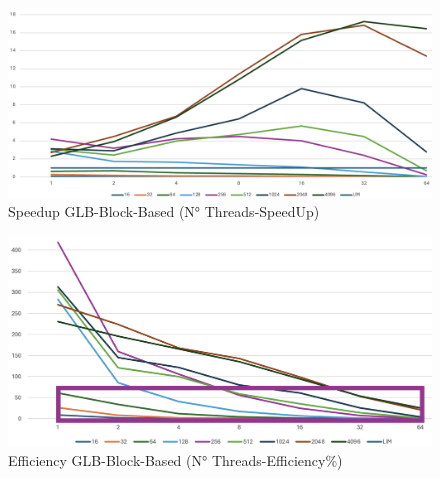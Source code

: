 \documentclass[conference]{IEEEtran}
\begin{document}
\begin{figure}[!h]
    \centering
    \includegraphics[width=1\columnwidth]{images/Image 1.03.png}
    \caption{Speedup GLB-Block-Based (N° Threads-SpeedUp)}
    \label{fig:figure2}
\end{figure}
\begin{figure}[!h]
    \centering
    \includegraphics[width=1\columnwidth]{images/Image 1.04.png}
    \caption{Efficiency GLB-Block-Based (N° Threads-Efficiency\%)}
    \label{fig:figure3}
\end{figure}
\if
\fi
\end{document}
